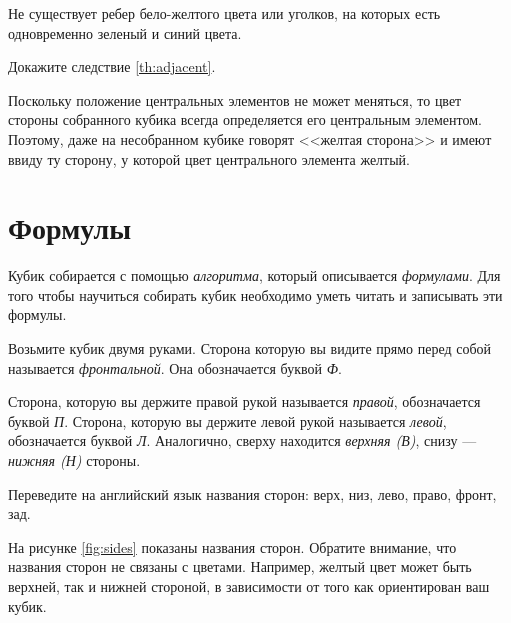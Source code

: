 \begin{corollary}\label{th:adjacent}
    Не существует ребер бело-желтого цвета или уголков, на которых есть одновременно зеленый и синий цвета.
\end{corollary}
\begin{exercise}
    Докажите следствие \ref{th:adjacent}.
\end{exercise}

Поскольку положение центральных элементов не может меняться, то цвет стороны собранного кубика всегда определяется его центральным элементом.
Поэтому, даже на несобранном кубике говорят <<желтая сторона>> и имеют ввиду ту сторону, у которой цвет центрального элемента желтый.


\section{Формулы}
Кубик собирается с помощью \emph{алгоритма}, который описывается \emph{формулами}.
Для того чтобы научиться собирать кубик необходимо уметь читать и записывать эти формулы.

Возьмите кубик двумя руками.
Сторона которую вы видите прямо перед собой называется \emph{фронтальной}.
Она обозначается буквой \emph{Ф}.

Сторона, которую вы держите правой рукой называется \emph{правой}, обозначается буквой \emph{П}.
Сторона, которую вы держите левой рукой называется \emph{левой}, обозначается буквой \emph{Л}.
Аналогично, сверху находится \emph{верхняя (В)}, снизу --- \emph{нижняя (Н)} стороны.

\begin{exercise}
    Переведите на английский язык названия сторон: верх, низ, лево, право, фронт, зад.
\end{exercise}

На рисунке \ref{fig:sides} показаны названия сторон.
Обратите внимание, что названия сторон не связаны с цветами.
Например, желтый цвет может быть верхней, так и нижней стороной, в зависимости от того как ориентирован ваш кубик.

